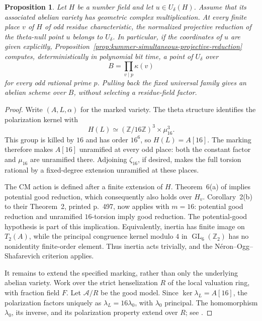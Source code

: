 \documentclass[11pt]{article}
\newtheorem{proposition}[theorem]{Proposition}
\theoremstyle{definition}
\theoremstyle{remark}
\begin{document}
\begin{proposition}\label{prop:kummer-integral-cm-theta}
Let \(H\) be a number field and let \(u\in U_\delta(H)\).
Assume that its associated abelian variety has geometric complex
multiplication.  At every finite place \(v\) of \(H\) of odd
residue characteristic, the normalized projective reduction of
the theta-null point \(u\) belongs to \(U_\delta\).
In particular, if the coordinates of \(u\) are given explicitly,
Proposition~\ref{prop:kummer-simultaneous-projective-reduction}
computes, deterministically in polynomial bit time, a point of
\(U_\delta\) over
\[
 B=\prod_{v\mid p}\kappa(v)
\]
for every odd rational prime \(p\).  Pulling back the fixed
universal family gives an abelian scheme over \(B\), without
selecting a residue-field factor.
\end{proposition}
\begin{proof}
Write \((A,L,\alpha)\) for the marked variety.  The theta
structure identifies the polarization kernel with
\[
 H(L)\simeq(\mathbb Z/16\mathbb Z)^3\times\mu_{16}^3.
\]
This group is killed by \(16\) and has order \(16^6\), so
\(H(L)=A[16]\).  The marking therefore makes \(A[16]\)
unramified at every odd place: both the constant factor and
\(\mu_{16}\) are unramified there.  Adjoining \(\zeta_{16}\),
if desired, makes the full torsion rational by a fixed-degree
extension unramified at these places.

The CM action is defined after a finite extension of \(H\).
Theorem~6(a) of \citet[p.~503]{SerreTate1968} implies potential
good reduction, which consequently also holds over \(H_v\).
Corollary~2(b) to their Theorem~2, printed p.~497, now applies
with \(m=16\): potential good reduction and unramified
\(16\)-torsion imply good reduction.  The potential-good
hypothesis is part of this implication.  Equivalently, inertia
has finite image on \(T_2(A)\), while the principal congruence
kernel modulo \(4\) in \(\operatorname{GL}_6(\mathbb Z_2)\)
has no nonidentity finite-order element.  Thus inertia acts
trivially, and the N\'eron--Ogg--Shafarevich criterion applies.

It remains to extend the specified marking, rather than only the
underlying abelian variety.  Work over the strict henselization
\(R\) of the local valuation ring, with fraction field \(F\).
Let \(\mathcal A/R\) be the good model.  Since
\(\ker\lambda_L=A[16]\), the polarization factors uniquely as
\(\lambda_L=16\lambda_0\), with \(\lambda_0\) principal.
The homomorphism \(\lambda_0\), its inverse, and its polarization
property extend over \(R\); see
\citet[Propositions~2.11 and 2.14, author pp.~17--18]{Milne1992}.


\end{proof}
\end{document}
